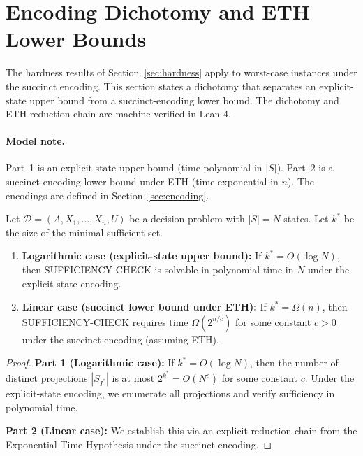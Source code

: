 \section{Encoding Dichotomy and ETH Lower Bounds}\label{sec:dichotomy}

The hardness results of Section~\ref{sec:hardness} apply to worst-case instances under the succinct encoding. This section states a dichotomy that separates an explicit-state upper bound from a succinct-encoding lower bound. The dichotomy and ETH reduction chain are machine-verified in Lean 4.

\paragraph{Model note.} Part~1 is an explicit-state upper bound (time polynomial in $|S|$). Part~2 is a succinct-encoding lower bound under ETH (time exponential in $n$). The encodings are defined in Section~\ref{sec:encoding}.

\begin{theorem}\label{thm:dichotomy}
Let $\mathcal{D} = (A, X_1, \ldots, X_n, U)$ be a decision problem with $|S| = N$ states. Let $k^*$ be the size of the minimal sufficient set.

\begin{enumerate}
\item \textbf{Logarithmic case (explicit-state upper bound):} If $k^* = O(\log N)$, then SUFFICIENCY-CHECK is solvable in polynomial time in $N$ under the explicit-state encoding.

\item \textbf{Linear case (succinct lower bound under ETH):} If $k^* = \Omega(n)$, then SUFFICIENCY-CHECK requires time $\Omega(2^{n/c})$ for some constant $c > 0$ under the succinct encoding (assuming ETH).
\end{enumerate}
\end{theorem}

\begin{proof}
\textbf{Part 1 (Logarithmic case):} If $k^* = O(\log N)$, then the number of distinct projections $|S_{I^*}|$ is at most $2^{k^*} = O(N^c)$ for some constant $c$. Under the explicit-state encoding, we enumerate all projections and verify sufficiency in polynomial time.

\textbf{Part 2 (Linear case):} We establish this via an explicit reduction chain from the Exponential Time Hypothesis under the succinct encoding.
\end{proof}

